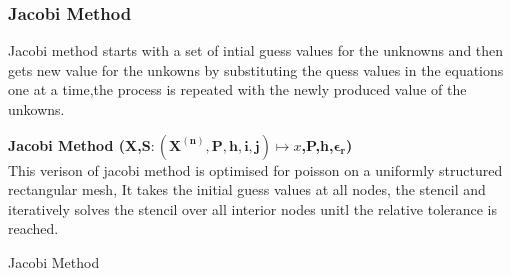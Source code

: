 \subsubsection{Jacobi Method}
Jacobi method starts with a set of intial guess values for the unknowns and then gets new value for the unkowns by substituting the quess values in the equations one at a time,the process is repeated with the newly produced value of the unkowns.\\[2mm]
\begin{algorithm}[H]
    \textbf{\large Jacobi Method (X,$\mathbf{S:(X^{(n)},P,h,i,j)} \mapsto x$,P,h,$\mathbf{\epsilon_r}$)}\\[-1pt]  
    This verison of jacobi method is optimised for poisson on a uniformly structured rectangular mesh, It takes the initial guess values at all nodes, the stencil and iteratively solves the stencil over all interior nodes unitl the relative tolerance is reached.  \\[2mm]
    \caption{Jacobi Method}
\end{algorithm}


